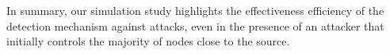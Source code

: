 In summary, our simulation study highlights the effectiveness efficiency of the detection mechanism against \drop attacks, even in the presence of an attacker that initially controls the majority of nodes close to the source. 



% 




% 
% 


